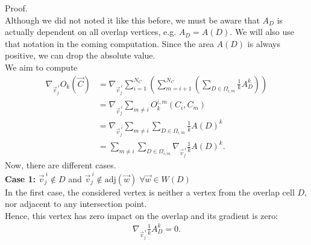 \begin{proposition}
	Proof. \\
	Although we did not noted it like this before, we must be aware that $A_D$ is actually dependent on all overlap vertices, e.g. $A_D = A(D)$.
	We will also use that notation in the coming computation. 
	Since the area $A(D)$ is always positive, we can drop the absolute value. \\
	We aim to compute 
	\begin{align*}
		\nabla_{\vec{v}_j^{\: i}} O_k(\vec{C}) 
		&= \nabla_{\vec{v}_j^{\: i}} \sum\limits_{i=1}^{N_C} \left( \sum\limits_{m=i+1}^{N_C} \left(\sum\limits_{D \in \Omega_{i,m}} \frac{1}{k}A_{D}^k\right) \right) \\
		&= \nabla_{\vec{v}_j^{\: i}} \sum\limits_{m \neq i} O_k^{i,m}(C_i, C_m) \\
		&= \nabla_{\vec{v}_j^{\: i}} \sum\limits_{m \neq i} \sum\limits_{D \in \Omega_{i,m}} \frac{1}{k}A(D)^k \\
		&= \sum\limits_{m \neq i} \sum\limits_{D \in \Omega_{i,m}} \nabla_{\vec{v}_j^{\: i}} \frac{1}{k}A(D)^k. 
	\end{align*}
	Now, there are different cases. \\
	\textbf{Case 1:} $\vec{v}_j^{\: i} \notin D$ and $\vec{v}_j^{\: i} \notin \text{adj}(\vec{w}) \; \forall \vec{w} \in W(D)$\\
	In the first case, the considered vertex is neither a vertex from the overlap cell $D$, nor adjacent to any intersection point. \\
	Hence, this vertex has zero impact on the overlap and its gradient is zero:
	\begin{align*}
		\nabla_{\vec{v}_j^{\: i}} \frac{1}{k}A_{D}^k = 0.
	\end{align*}


\end{proposition}

